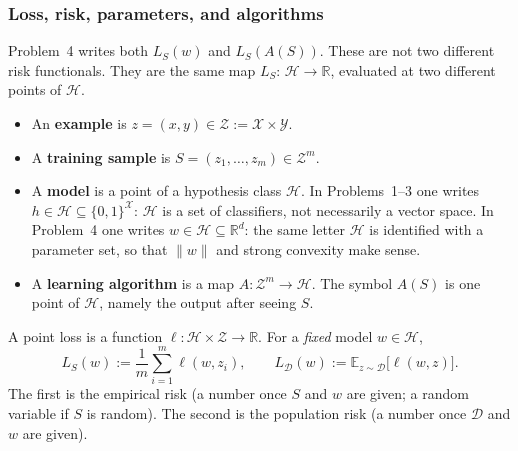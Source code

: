 \subsubsection{Loss, risk, parameters, and algorithms}
\label{subsubsec:mlu-loss-risk}

Problem~4 writes both $L_S(w)$ and $L_S(A(S))$. These are not two different risk functionals. They are the same map $L_S:\,\mathcal{H}\to\mathbb{R}$, evaluated at two different points of $\mathcal{H}$.

\begin{notation}
\label{not:mlu-four-spaces}
\begin{itemize}
    \item An \textbf{example} is $z=(x,y)\in\mathcal{Z}:=\mathcal{X}\times\mathcal{Y}$.
    \item A \textbf{training sample} is $S=(z_1,\dots,z_m)\in\mathcal{Z}^m$.
    \item A \textbf{model} is a point of a hypothesis class $\mathcal{H}$. In Problems~1--3 one writes $h\in\mathcal{H}\subseteq\{0,1\}^{\mathcal{X}}$: $\mathcal{H}$ is a set of classifiers, not necessarily a vector space. In Problem~4 one writes $w\in\mathcal{H}\subseteq\mathbb{R}^d$: the same letter $\mathcal{H}$ is identified with a parameter set, so that $\lVert w\rVert$ and strong convexity make sense.
    \item A \textbf{learning algorithm} is a map $A:\mathcal{Z}^m\to\mathcal{H}$. The symbol $A(S)$ is one point of $\mathcal{H}$, namely the output after seeing $S$.
\end{itemize}
\end{notation}

\begin{definition}
\label{def:mlu-loss-risk}
A point loss is a function $\ell:\mathcal{H}\times\mathcal{Z}\to\mathbb{R}$. For a \emph{fixed} model $w\in\mathcal{H}$,
\[
L_S(w)
:=
\frac{1}{m}\sum_{i=1}^m\ell(w,z_i),
\qquad
L_{\mathcal{D}}(w)
:=
\mathbb{E}_{z\sim\mathcal{D}}\bigl[\ell(w,z)\bigr].
\]
The first is the empirical risk (a number once $S$ and $w$ are given; a random variable if $S$ is random). The second is the population risk (a number once $\mathcal{D}$ and $w$ are given).
\end{definition}

